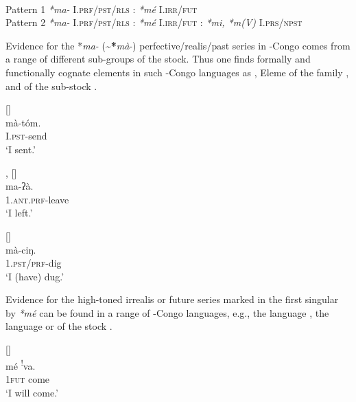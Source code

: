 \documentclass[output=paper]{langsci/langscibook}
\begin{document}
\ea\label{ex:anderson:71}
 \\
Pattern 1  \textit{*ma-} I.\textsc{prf/pst/rls}  :  \textit{*mé}  I.\textsc{irr/fut}\\  
Pattern 2  \textit{*ma-} I.\textsc{prf/pst/rls}  :  \textit{*mé} I.\textsc{irr/fut}  :   \textit{*mi, *m(V)} I.\textsc{prs/npst}\\
\z

Evidence for the *\textit{ma-} ({\textasciitilde}\textbf{*}\textit{mà}-) perfective/realis/past series in -Congo  comes from a range of different sub-groups of the stock. Thus one finds formally and functionally cognate elements in such -Congo languages as   , Eleme of the  family , and  of the  sub-stock .

\ea\label{ex:anderson:72}
   \citep[72]{Ngoran1999}            []\\
\gll mà-tóm. \\
\textsc{I.pst-}send\\
\glt  `I sent.'   
\z

\ea\label{ex:anderson:73}
  \citep[1482]{Bond2008}, \citep{Bond2010}        []\\
\gll ma-ʔà.\\
1.\textsc{ant.prf}-leave\\
\glt `I left.'
\z

\ea\label{ex:anderson:74}
  \citep[299, 301]{Bouquiaux1970}          []\\
\gll mà-ciŋ.\\
1.\textsc{pst/prf}-dig\\
\glt `I (have) dug.'
\z

Evidence for the high-toned irrealis or future series marked in the first singular by \textit{*mé} can be found in a range of -Congo languages, e.g., the  language  , the  language   or  of the  stock .

\ea\label{ex:anderson:75}
  \citep[ 4]{Arnott19671980}        []\\
 \gll mé    \textsuperscript{!}va.\\
\textsc{1fut}  come\\
\glt `I will come.'
\z
\end{document}
